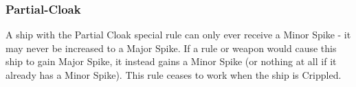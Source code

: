 \subsubsection{Partial-Cloak}

A ship with the Partial Cloak special rule can only ever receive a Minor Spike - it may never be increased to a Major Spike. If a rule or weapon would cause this ship to gain Major Spike, it instead gains a Minor Spike (or nothing at all if it already has a Minor Spike). This rule ceases to work when the ship is Crippled.